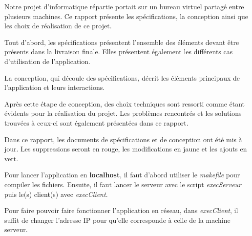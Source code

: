 Notre projet d'informatique répartie portait sur un bureau virtuel partagé entre plusieurs machines. Ce rapport présente les spécifications, la conception ainsi que les choix de réalisation de ce projet.

Tout d'abord, les spécifications présentent l'ensemble des éléments devant être présents dans la livraison finale. Elles présentent également les différents cas d'utilisation de l'application.

La conception, qui découle des spécifications, décrit les éléments principaux de l'application et leurs interactions. 

Après cette étape de conception, des choix techniques sont ressorti comme étant évidents pour la réalisation du projet. Les problèmes rencontrés et les solutions trouvées à ceux-ci sont également présentées dans ce rapport.

Dans ce rapport, les documents de spécifications et de conception ont été mis à jour. Les suppressions seront en rouge, les modifications en jaune et les ajouts en vert.

Pour lancer l'application en \textbf{localhost}, il faut d'abord utiliser le \textit{makefile} pour compiler les fichiers. Ensuite, il faut lancer le serveur avec le script \textit{execServeur} puis le(s) client(s) avec \textit{execClient}. 

Pour faire pouvoir faire fonctionner l'application en réseau, dans \textit{execClient}, il suffit de changer l'adresse IP pour qu'elle corresponde à celle de la machine serveur.